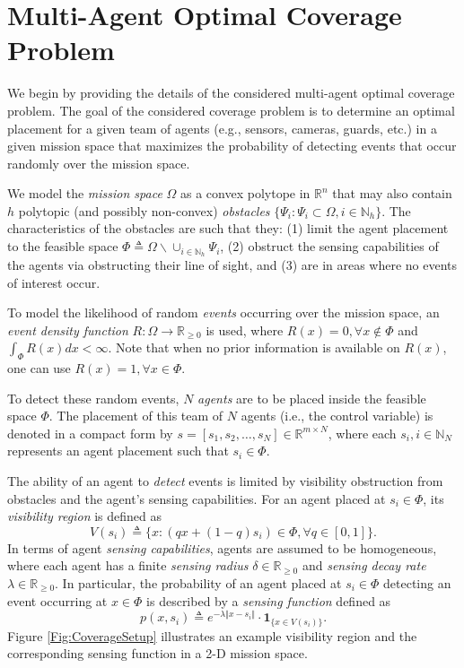\documentclass[letterpaper, 10 pt, conference]{ieeeconf}
\newcommand{\R}{\mathbb{R}}
\newcommand{\N}{\mathbb{N}}
\begin{document}
\section{Multi-Agent Optimal Coverage Problem}
\label{Sec:CoverageProblem}
We begin by providing the details of the considered multi-agent optimal coverage problem. The goal of the considered coverage problem is to determine an optimal placement for a given team of agents (e.g., sensors, cameras, guards, etc.) in a given mission space that maximizes the probability of detecting events that occur randomly over the mission space. 

We model the \emph{mission space} $\Omega$ as a convex polytope in $\R^n$ that may also contain $h$ polytopic (and possibly non-convex) \emph{obstacles} $\{\Psi_i:\Psi_i\subset\Omega, i\in\mathbb{N}_h\}$. The characteristics of the obstacles are such that they: (1) limit the agent placement to the feasible space $\Phi \triangleq \Omega \backslash \cup_{i\in\N_h} \Psi_i$, (2) obstruct the sensing capabilities of the agents via obstructing their line of sight, and (3) are in areas where no events of interest occur. 

To model the likelihood of random \emph{events} occurring over the mission space, an \emph{event density function} $R:\Omega \rightarrow \R_{\geq0}$ is used, where $R(x) = 0, \forall x \not\in \Phi$ and $\int_\Phi R(x)dx <\infty$. Note that when no prior information is available on $R(x)$, one can use $R(x)=1, \forall x\in \Phi$. 

To detect these random events, $N$ \emph{agents} are to be placed inside the feasible space $\Phi$. The placement of this team of $N$ agents (i.e., the control variable) is denoted in a compact form by $s = [s_1, s_2, \ldots, s_N]\in\R^{m\times N}$, where each $s_i, i\in\N_N$ represents an agent placement such that $s_i\in \Phi$. 

The ability of an agent to \emph{detect} events is limited by visibility obstruction from obstacles and the agent's sensing capabilities. For an agent placed at $s_i \in \Phi$, its \emph{visibility region} is defined as 
$$
V(s_i) \triangleq \{x: (qx+(1-q)s_i)\in \Phi, \forall q \in [0,1] \}.
$$ 
In terms of agent \emph{sensing capabilities}, agents are assumed to be homogeneous, where each agent has a finite \emph{sensing radius} $\delta \in \R_{\geq 0}$ and \emph{sensing decay rate} $\lambda\in\R_{\geq 0}$. In particular, the probability of an agent placed at $s_i\in \Phi$ detecting an event occurring at $x\in \Phi$ is described by a \emph{sensing function} defined as 
$$
p(x,s_i)\triangleq e^{-\lambda \Vert x - s_i\Vert}\cdot\mathbf{1}_{\{x\in V(s_i)\}}.
$$
Figure \ref{Fig:CoverageSetup} illustrates an example visibility region and the corresponding sensing function in a 2-D mission space.
\end{document}
